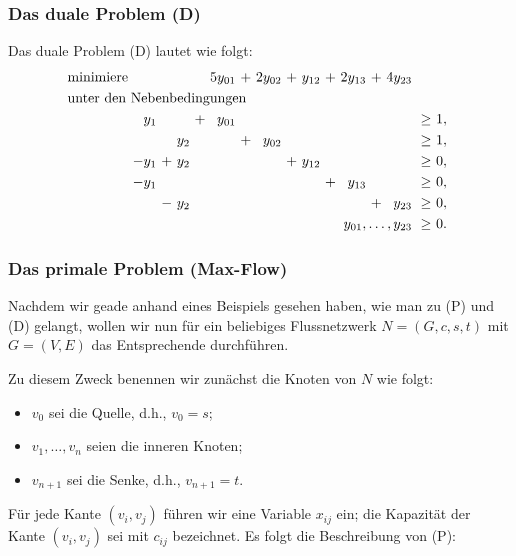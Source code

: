 \documentclass[smaller]{beamer}
\begin{document}
\begin{frame}
\frametitle{Das duale Problem (D)}
Das duale Problem (D) lautet wie folgt:
\begin{align*}
\begin{alignedat}{9}
& \text{minimiere } & & & & &\ 5y_{01} &\ + &\ 2y_{02} &\ + &\ y_{12} &\ + &\ 2y_{13} &\ + &\ 4y_{23} & & \\
& \rlap{unter den Nebenbedingungen} & & & & & & & & & & & & & & & \\
&&  y_1 &\   &\     &\ + &\ y_{01} &\   &\        &\   &\        &\   &\        &\   &\        &\ \geq &\ 1,\ \\
&&      &\   &\ y_2 &\   &\        &\ + &\ y_{02} &\   &\        &\   &\        &\   &\        &\ \geq &\ 1,\ \\
&& -y_1 &\ + &\ y_2 &\   &\        &\   &\        &\ + &\ y_{12} &\   &\        &\   &\        &\ \geq &\ 0,\ \\
&& -y_1 &\   &\     &\   &\        &\   &\        &\   &\        &\ + &\ y_{13} &\   &\        &\ \geq &\ 0,\ \\
&&      &\ - &\ y_2 &\   &\        &\   &\        &\   &\        &\   &\        &\ + &\ y_{23} &\ \geq &\ 0,\ \\
&&     & & & & & & & & & & & & \llap{$y_{01},\ldots,y_{23}$} &\ \geq &\ 0.\
\end{alignedat}
\end{align*}
\end{frame}

\begin{frame}
\frametitle{Das primale Problem (Max-Flow)}
Nachdem wir geade anhand eines Beispiels gesehen haben, wie man zu (P) und (D) gelangt, \alert{wollen wir nun für ein beliebiges Flussnetzwerk $N = (G,c,s,t)$ mit $G = (V,E)$ das Entsprechende durchführen}. \\ \vspace*{0.2cm}

Zu diesem Zweck benennen wir zunächst die Knoten von $N$ wie folgt:
\begin{itemize}
\item $v_0$ sei die Quelle, d.h., $v_0=s$;
\item $v_1,\ldots,v_n$ seien die inneren Knoten;
\item $v_{n+1}$ sei die Senke, d.h., $v_{n+1}=t$.
\end{itemize} \vspace*{0.2cm}

Für jede Kante $(v_i,v_j)$ führen wir eine Variable $x_{ij}$ ein; die Kapazität der Kante $(v_i,v_j)$ sei mit $c_{ij}$ bezeichnet. Es folgt die \alert{Beschreibung von (P)}:
\end{frame}
\end{document}
